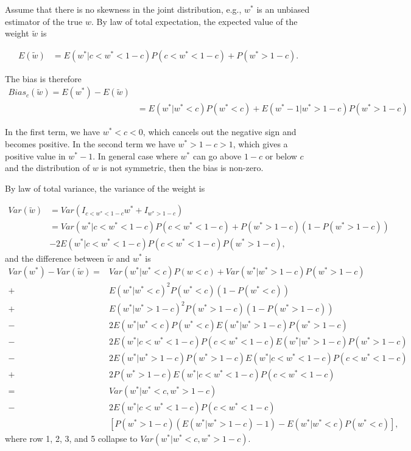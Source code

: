 \documentclass[11pt]{article}
\begin{document}
Assume that there is no skewness in the joint distribution, e.g.,
\(w^*\) is an unbiased estimator of the true \(w\). By law of total expectation, the expected value of
the weight \(\tilde{w}\) is

\begin{equation}
\label{eqn: E w trunc}
\begin{aligned}
E(\tilde{w}) &= E(w^*|c<w^*<1-c)P(c<w^*<1-c) + P(w^*>1-c).
\end{aligned}
\end{equation}

The bias is therefore
\begin{equation}
\label{eqn: bias w trunc}
\begin{aligned}
Bias_c(\tilde{w}) = E(w^*) - E(\tilde{w}) \\
&= E(w^*|w^*<c)P(w^*<c) + E(w^*-1|w^*>1-c)P(w^*>1-c)
\end{aligned}
\end{equation}

In the first term, we have \(w^*<c<0\), which cancels out the negative
sign and becomes positive. In the second term we have \(w^*>1-c>1\), which
gives a positive value in \(w^*-1\). In general case where \(w^*\) can go
above \(1-c\) or below \(c\) and the distribution of \(w\) is not symmetric, then the
bias is non-zero.

By law of total variance, the variance of the weight is

\begin{equation}
\label{eqn: var w trunc}
\begin{aligned}
Var(\tilde{w}) &= Var(I_{c<w^*<1-c}w^*+I_{w^*>1-c})\\
&=Var(w^*|c<w^*<1-c)P(c<w^*<1-c) + P(w^*>1-c)(1-P(w^*>1-c)) \\&- 2E(w^*|c<w^*<1-c)P(c<w^*<1-c)P(w^*>1-c),
\end{aligned}
\end{equation}
and the difference between $\tilde{w}$ and $w^*$ is
\begin{equation}
\label{eqn: delta var w trunc}
\begin{aligned}
Var(w^*) - Var(\tilde{w}) =& Var(w^* | w^*<c)P(w<c)+Var(w^*|w^*>1-c)P(w^*>1-c)\\
+&E(w^*|w^*<c)^2P(w^*<c)(1-P(w^*<c))\\
+&E(w^*|w^*>1-c)^2P(w^*>1-c)(1-P(w^*>1-c))\\
-&2E(w^*|w^*<c)P(w^*<c)E(w^*|w^*>1-c)P(w^*>1-c)\\
-&2E(w^*|c<w^*<1-c)P(c<w^*<1-c)E(w^*|w^*>1-c)P(w^*>1-c)\\
-&2E(w^*|w^*>1-c)P(w^*>1-c)E(w^*|c<w^*<1-c)P(c<w^*<1-c)\\
+&2P(w^*>1-c)E(w^*|c<w^*<1-c)P(c<w^*<1-c)\\
=& Var(w^*|w^*<c, w^*>1-c)\\
-&2E(w^*|c<w^*<1-c)P(c<w^*<1-c)\\&[P(w^*>1-c)(E(w^*|w^*>1-c)-1)-E(w^*|w^*<c)P(w^*<c)],
\end{aligned}
\end{equation}
where row 1, 2, 3, and 5 collapse to $Var(w^*|w^*<c, w^*>1-c)$.
\end{document}

